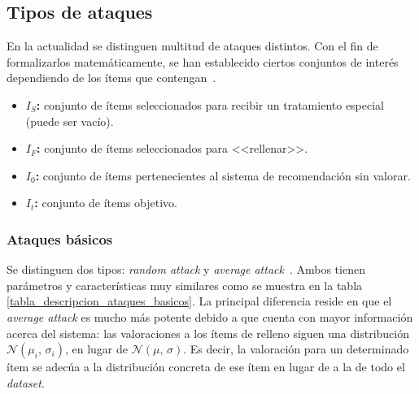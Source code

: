 		
\subsection{Tipos de ataques}

En la actualidad se distinguen multitud de ataques distintos. Con el fin de formalizarlos matemáticamente, se han establecido ciertos conjuntos de interés dependiendo de los ítems que contengan~\cite{zhou2021SemisupervisedRecommendationAttack}.

\begin{itemize}
	
	\item \textbf{$I_S$:} conjunto de ítems seleccionados para recibir un tratamiento especial (puede ser vacío).
	\item \textbf{$I_F$:} conjunto de ítems seleccionados para <<rellenar>>.
	\item \textbf{$I_0$:} conjunto de ítems pertenecientes al sistema de recomendación sin valorar.
	\item \textbf{$I_t$:} conjunto de ítems objetivo.
	
\end{itemize}


\subsubsection{Ataques básicos}

Se distinguen dos tipos: \textit{random attack} y \textit{average attack}~\cite{mingdan2018ShillingAttacksAReview}. Ambos tienen parámetros y características muy similares como se muestra en la tabla \ref{tabla_descripcion_ataques_basicos}. La principal diferencia reside en que el \textit{average attack} es mucho más potente debido a que cuenta con mayor información acerca del sistema: las valoraciones a los ítems de relleno siguen una distribución $\mathcal{N}(\mu_i,\,\sigma_i)$, en lugar de $\mathcal{N}(\mu,\,\sigma)$. Es decir, la valoración para un determinado ítem se adecúa a la distribución concreta de ese ítem en lugar de a la de todo el \textit{dataset}.


